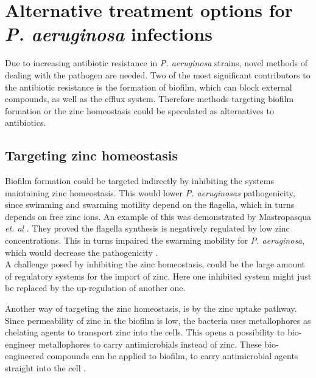 \section{Alternative treatment options for \emph{P. aeruginosa} infections} \label{Alternative treatment}

Due to increasing antibiotic resistance in \emph{P. aeruginosa} strains, novel methods of dealing with the pathogen are needed. Two of the most significant contributors to the antibiotic resistance is the formation of biofilm, which can block external compounds, as well as the efflux system. Therefore methods targeting biofilm formation or the zinc homeostasis could be speculated as alternatives to antibiotics. 

\subsection{Targeting zinc homeostasis}
Biofilm formation could be targeted indirectly by inhibiting the systems maintaining zinc homeostasis. This would lower \emph{P. aeruginosas} pathogenicity, since swimming and swarming motility depend on the flagella, which in turns depends on free zinc ions. An example of this was demonstrated by Mastropasqua \emph{et. al} \cite{Mastropasqua2018EfficientLung}. They proved the flagella synthesis is negatively regulated by low zinc concentrations. This in turns impaired the swarming mobility for \emph{P. aeruginosa}, which would decrease the pathogenicity \cite{Mastropasqua2018EfficientLung}.\\

\noindent A challenge posed by inhibiting the zinc homeostasis, could be the large amount of regulatory systems for the import of zinc. Here one inhibited system might just be replaced by the up-regulation of another one.

Another way of targeting the zinc homeostasis, is by the zinc uptake pathway. Since permeability of zinc in the biofilm is low, the bacteria uses metallophores as chelating agents to transport zinc into the cells. This opens a possibility to bio-engineer metallophores to carry antimicrobials instead of zinc. These bio-engineered compounds can be applied to biofilm, to carry antimicrobial agents straight into the cell \cite{Mastropasqua2018EfficientLung}.

